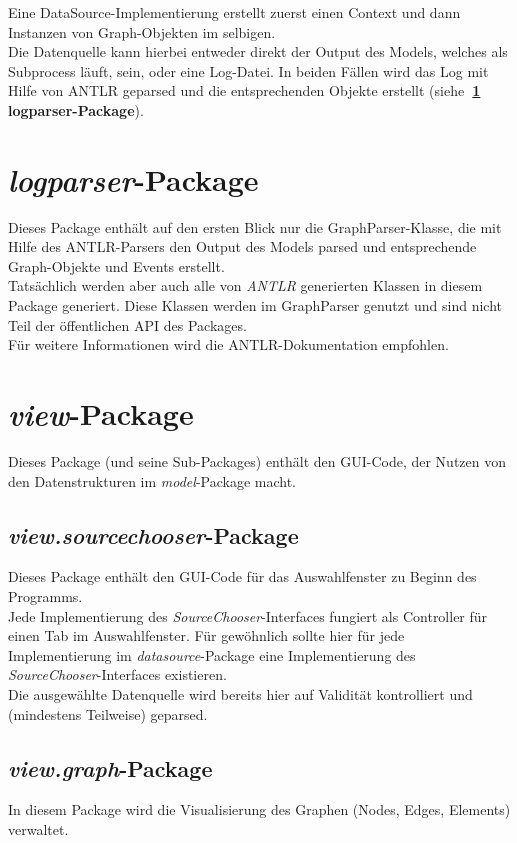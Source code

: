 \documentclass[accentcolor=tud0b,12pt,paper=a4]{tudreport}
\begin{document}
	Eine DataSource-Implementierung erstellt zuerst einen Context und dann Instanzen von Graph-Objekten im selbigen.\\
	Die Datenquelle kann hierbei entweder direkt der Output des Models, welches als Subprocess läuft, sein, oder eine Log-Datei.
	In beiden Fällen wird das Log mit Hilfe von ANTLR geparsed und die entsprechenden Objekte erstellt (siehe\textbf{~\ref{logparser} logparser-Package}).
	
	\chapter{\textit{logparser}-Package}
	\label{logparser}
		Dieses Package enthält auf den ersten Blick nur die GraphParser-Klasse, die mit Hilfe des ANTLR-Parsers den Output des Models parsed und entsprechende Graph-Objekte und Events erstellt.\\
		Tatsächlich werden aber auch alle von \textit{ANTLR} generierten Klassen in diesem Package generiert. Diese Klassen werden im GraphParser genutzt und sind nicht Teil der öffentlichen API des Packages.\\
		
		Für weitere Informationen wird die ANTLR-Dokumentation empfohlen.
		
	\chapter{\textit{view}-Package}
		Dieses Package (und seine Sub-Packages) enthält den GUI-Code, der Nutzen von den Datenstrukturen im \textit{model}-Package macht.
	
	\section{\textit{view.sourcechooser}-Package}
		Dieses Package enthält den GUI-Code für das Auswahlfenster zu Beginn des Programms.\\

		Jede Implementierung des \textit{SourceChooser}-Interfaces fungiert als Controller für einen Tab im Auswahlfenster.
		Für gewöhnlich sollte hier für jede Implementierung im \textit{datasource}-Package eine Implementierung des \textit{SourceChooser}-Interfaces existieren.\\
		
		Die ausgewählte Datenquelle wird bereits hier auf Validität kontrolliert und (mindestens Teilweise) geparsed.
		
	\section{\textit{view.graph}-Package}
		In diesem Package wird die Visualisierung des Graphen (Nodes, Edges, Elements) verwaltet.\\
		
\end{document}
